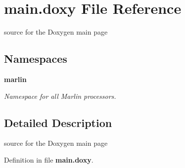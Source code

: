 \section{main.\-doxy File Reference}
\label{main_8doxy}


source for the Doxygen main page  


\subsection*{Namespaces}
\begin{DoxyCompactItemize}
\item 
{\bf marlin}
\begin{DoxyCompactList}\small\item\em Namespace for all Marlin processors. \end{DoxyCompactList}\end{DoxyCompactItemize}


\subsection{Detailed Description}
source for the Doxygen main page 

Definition in file {\bf main.\-doxy}.

